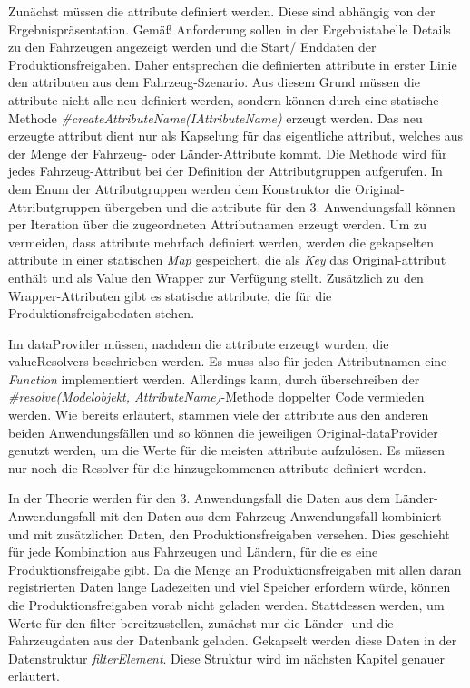 Zunächst müssen die \gls{attribut}e definiert werden. Diese sind abhängig von der Ergebnispräsentation. Gemäß Anforderung sollen in der Ergebnistabelle Details zu den Fahrzeugen angezeigt werden und die Start/ Enddaten der Produktionsfreigaben. Daher entsprechen die definierten \gls{attribut}e in erster Linie den \gls{attribut}en aus dem Fahrzeug-Szenario. Aus diesem Grund müssen die \gls{attribut}e nicht alle neu definiert werden, sondern können durch eine statische Methode \textit{\#createAttributeName(IAttributeName)} erzeugt werden. Das neu erzeugte \gls{attribut} dient nur als Kapselung für das eigentliche \gls{attribut}, welches aus der Menge der Fahrzeug- oder Länder-Attribute kommt. Die Methode wird für jedes Fahrzeug-Attribut bei der Definition der Attributgruppen aufgerufen. In dem Enum der Attributgruppen werden dem Konstruktor die Original-Attributgruppen übergeben und die \gls{attribut}e für den 3. Anwendungsfall können per Iteration über die zugeordneten Attributnamen erzeugt werden. Um zu vermeiden, dass \gls{attribut}e mehrfach definiert werden, werden die gekapselten \gls{attribut}e in einer statischen \textit{Map} gespeichert, die als \textit{Key} das Original-\gls{attribut} enthält und als Value den Wrapper zur Verfügung stellt. Zusätzlich zu den Wrapper-Attributen gibt es statische \gls{attribut}e, die für die Produktionsfreigabedaten stehen.

Im \gls{dataProvider} müssen, nachdem die \gls{attribut}e erzeugt wurden, die \gls{valueResolver}s beschrieben werden. Es muss also für jeden Attributnamen eine \textit{Function} implementiert werden. Allerdings kann, durch überschreiben der \textit{\#resolve(Modelobjekt, AttributeName)}-Methode doppelter Code vermieden werden. Wie bereits erläutert, stammen viele der \gls{attribut}e aus den anderen beiden Anwendungsfällen und so können die jeweiligen Original-\gls{dataProvider} genutzt werden, um die Werte für die meisten \gls{attribut}e aufzulösen. Es müssen nur noch die Resolver für die hinzugekommenen \gls{attribut}e definiert werden.

In der Theorie werden für den 3. Anwendungsfall die Daten aus dem Länder-An\-wen\-dungs\-fall mit den Daten aus dem Fahrzeug-Anwendungsfall kombiniert und mit zusätzlichen Daten, den Produktionsfreigaben versehen. Dies geschieht für jede Kombination aus Fahrzeugen und Ländern, für die es eine Produktionsfreigabe gibt. Da die Menge an Produktionsfreigaben mit allen daran registrierten Daten lange Ladezeiten und viel Speicher erfordern würde, können die Produktionsfreigaben vorab nicht geladen werden. Stattdessen werden, um Werte für den \gls{filter} bereitzustellen, zunächst nur die Länder- und die Fahrzeugdaten aus der Datenbank geladen. Gekapselt werden diese Daten in der Datenstruktur \textit{\gls{filterElement}}. Diese Struktur wird im nächsten Kapitel genauer erläutert.

